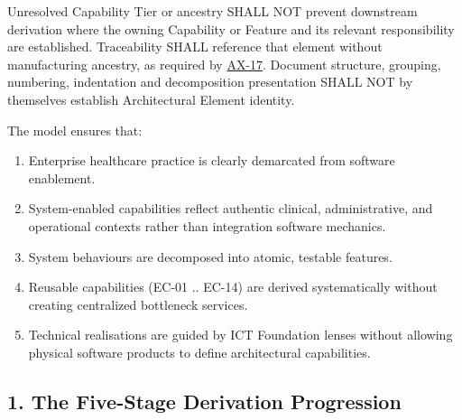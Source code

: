\label{rad:tier-model:34}

Unresolved Capability Tier or ancestry SHALL NOT prevent downstream derivation where the owning Capability or Feature and its relevant responsibility are established. Traceability SHALL reference that element without manufacturing ancestry, as required by \href{https://github.com/fhirfactory/harmonia/blob/98410db60155198a75f74c79d98060070209faa1/docs/markdown/governance/architectural-axioms.md\#ax-17}{AX-17}. Document structure, grouping, numbering, indentation and decomposition presentation SHALL NOT by themselves establish Architectural Element identity.

\label{rad:tier-model:36}

The model ensures that:

\label{rad:tier-model:37}

\begin{enumerate}

\item
Enterprise healthcare practice is clearly demarcated from software enablement.



\item
System-enabled capabilities reflect authentic clinical, administrative, and operational contexts rather than integration software mechanics.



\item
System behaviours are decomposed into atomic, testable features.



\item
Reusable capabilities (EC-01 .. EC-14) are derived systematically without creating centralized bottleneck services.



\item
Technical realisations are guided by ICT Foundation lenses without allowing physical software products to define architectural capabilities.



\end{enumerate}
\label{rad:tier-model:43}

\par\smallskip
{}\label{rad:tier-model:45}
\subsection*{1. The Five-Stage Derivation Progression}
\label{rad:tier-model:47}

